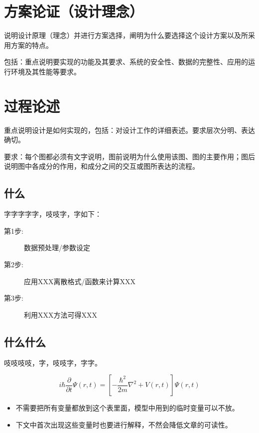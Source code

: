\documentclass[fontset=fandol]{ctexart}
\begin{document}
\section{方案论证（设计理念）}

说明设计原理（理念）并进行方案选择，阐明为什么要选择这个设计方案以及所采用方案的特点。

包括：重点说明要实现的功能及其要求、系统的安全性、数据的完整性、应用的运行环境及其性能等要求。

\section{过程论述}

重点说明设计是如何实现的，包括：对设计工作的详细表述。要求层次分明、表达确切。

要求：每个图都必须有文字说明，图前说明为什么使用该图、图的主要作用；图后说明图中各成分的作用，和成分之间的交互或图所表达的流程。

\subsection{什么}

字字字字字，吱吱字，字如下：
\begin{description}
	\item[第1步:] 数据预处理/参数设定
	\item[第2步:] 应用XXX离散格式/函数来计算XXX
	\item[第3步:] 利用XXX方法可得XXX
\end{description}

\subsection{什么什么}

吱吱吱吱，字，吱吱字，字字。

\begin{equation}\label{eq1}
	i\hbar\frac{\partial}{\partial t} \Psi(r,t)  = \left[
	-\frac{\hbar^2}{2m}\nabla^2+V(r,t) \right]\Psi(r,t) 
\end{equation}

\begin{itemize}
	\item[1.]不需要把所有变量都放到这个表里面，模型中用到的临时变量可以不放。
	\item[2.]下文中首次出现这些变量时也要进行解释，不然会降低文章的可读性。
\end{itemize}
\end{document}
